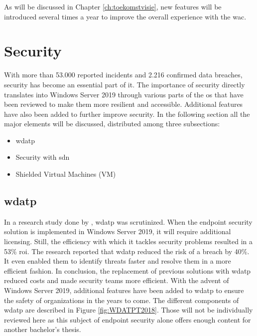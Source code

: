 As will be discussed in Chapter \ref{ch:toekomstvisie}, new features will be introduced several times a year to improve the overall experience with the \acrlong{wac}.

\clearpage

\section{Security}
With more than 53.000 reported incidents and 2.216 confirmed data breaches, security has become an essential part of \acrshort{it}. \autocite{Verizon2018}
The importance of security directly translates into Windows Server 2019 through various parts of the \acrshort{os} that have been reviewed to make them more resilient and accessible. Additional features have also been added to further improve security. 
In the following section all the major elements will be discussed, distributed among three subsections:
\begin{itemize}
	\item \acrfull{wdatp}
	\item Security with \acrfull{sdn}
	\item Shielded Virtual Machines (VM)
\end{itemize}

\subsection{\acrfull{wdatp}}
In a research study done by \textcite{Musto2017}, \acrshort{wdatp} was scrutinized. 
When the endpoint security solution is implemented in Windows Server 2019, it will require additional licensing. 
Still, the efficiency with which it tackles security problems resulted in a 53\% \acrfull{roi}. 
The research reported that \acrshort{wdatp} reduced the risk of a breach by 40\%. 
It even enabled them to identify threats faster and resolve them in a more efficient fashion. 
In conclusion, the replacement of previous solutions with \acrshort{wdatp} reduced costs and made security teams more efficient. 
With the advent of Windows Server 2019, additional features have been added to \acrshort{wdatp} to ensure the safety of organizations in the years to come. 
The different components of \acrshort{wdatp} are described in Figure \ref{fig:WDATPT2018}. 
Those will not be individually reviewed here as this subject of endpoint security alone offers enough content for another bachelor's thesis.

